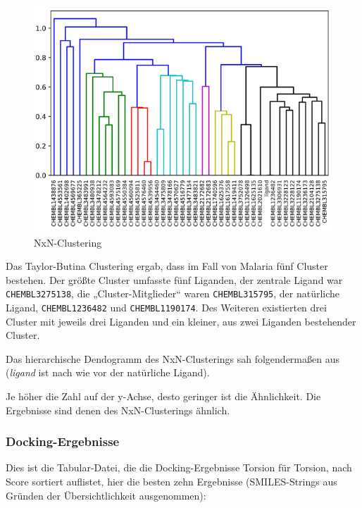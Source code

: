 \documentclass[10pt]{article}
\begin{document}
    \begin{figure}
        \includegraphics[width=\linewidth]{NxN-Clustering}
        \caption{NxN-Clustering}\label{fig:nxn}
    \end{figure}

    Das Taylor-Butina Clustering ergab, dass im Fall von Malaria fünf Cluster bestehen.
    Der größte Cluster umfasste
    fünf Liganden, der zentrale Ligand war \texttt{CHEMBL3275138}, die „Cluster-Mitglieder“ waren
    \texttt{CHEMBL315795}, der natürliche
    Ligand, \texttt{CHEMBL1236482} und \texttt{CHEMBL1190174}.
    Des Weiteren existierten drei Cluster mit jeweils drei
    Liganden und ein kleiner, aus zwei Liganden bestehender Cluster.

    Das hierarchische Dendogramm des NxN-Clusterings sah folgendermaßen aus (\emph{ligand} ist nach wie vor der
    natürliche
    Ligand).


    Je höher die Zahl auf der y-Achse, desto geringer ist die Ähnlichkeit. Die Ergebnisse sind denen des
    NxN-Clusterings ähnlich.

    \subsubsection{Docking-Ergebnisse}
    Dies ist die Tabular-Datei, die die Docking-Ergebnisse Torsion für Torsion, nach Score sortiert auflistet, hier
    die besten zehn Ergebnisse (SMILES-Strings aus Gründen der Übersichtlichkeit ausgenommen):
\end{document}
